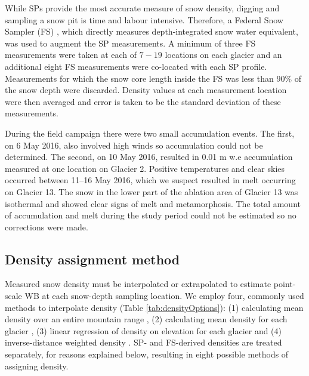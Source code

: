 \documentclass[twocolumn, letterpaper]{igs}
\begin{document}
While SPs provide the most accurate measure of snow density, digging and sampling a snow pit is time and labour intensive. Therefore, a Federal Snow Sampler (FS) \citep{Clyde1932}, which directly measures depth-integrated snow water equivalent, was used to augment the SP measurements. A minimum of three FS measurements were taken at each of $7-19$ locations on each glacier and an additional eight FS measurements were co-located with each SP profile. Measurements for which the snow core length inside the FS was less than 90\% of the snow depth were discarded. Density values at each measurement location were then averaged and error is taken to be the standard deviation of these measurements.

During the field campaign there were two small accumulation events. The first, on 6 May 2016, also involved high winds so accumulation could not be determined. The second, on 10 May 2016, resulted in 0.01 m w.e accumulation measured at one location on Glacier 2. Positive temperatures and clear skies occurred between 11--16 May 2016, which we suspect resulted in melt occurring on Glacier 13. The snow in the lower part of the ablation area of Glacier 13 was isothermal and showed clear signs of melt and metamorphosis. The total amount of accumulation and melt during the study period could not be estimated so no corrections were made. 

\subsection{Density assignment method}

Measured snow density must be interpolated or extrapolated to estimate point-scale WB at each snow-depth sampling location. We employ four, commonly used methods to interpolate density (Table \ref{tab:densityOptions}): (1) calculating mean density over an entire mountain range \citep[e.g.][]{Cullen2017}, (2) calculating mean density for each glacier \citep[e.g.][]{Elder1991, McGrath2015}, (3) linear regression of density on elevation for each glacier \citep[e.g.][]{Elder1998, Molotch2005} and (4) inverse-distance weighted density \citep[e.g.][]{Molotch2005}.  SP- and FS-derived densities are treated separately, for reasons explained below, resulting in eight possible methods of assigning density.
\end{document}
